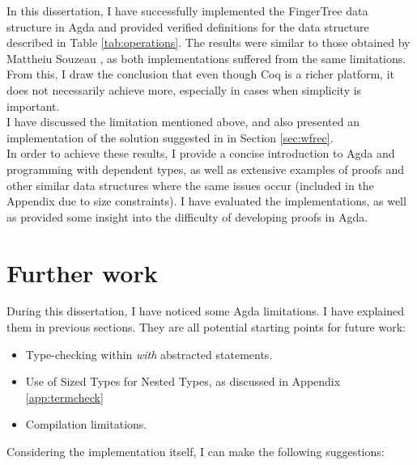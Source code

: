 \documentclass[12pt,twoside,notitlepage]{report}
\begin{document}
In this dissertation, I have successfully implemented the FingerTree data structure \cite{fingertrees} in Agda \cite{agdatutorial} and provided verified definitions for the data structure described in Table \ref{tab:operations}. The results were similar to those obtained by Mattheiu Souzeau \cite{coq}, as both implementations suffered from the same limitations. From this, I draw the conclusion that even though Coq is a richer platform, it does not necessarily achieve more, especially in cases when simplicity is important. \\
I have discussed the limitation mentioned above, and also presented an implementation of the solution suggested in \cite{coq} in Section \ref{sec:wfrec}. 
\\
In order to achieve these results, I provide a concise introduction to Agda and programming with dependent types, as well as extensive examples of proofs and other similar data structures where the same issues occur (included in the Appendix due to size constraints).
I have evaluated the implementations, as well as provided some insight into the difficulty of developing proofs in Agda.


\section{Further work}

During this dissertation, I have noticed some Agda limitations. I have explained them in previous sections. They are all potential starting points for future work:

\begin{itemize}
\item Type-checking within \textit{with} abstracted statements.
\item Use of Sized Types for Nested Types, as discussed in Appendix \ref{app:termcheck}
\item Compilation limitations.
\end{itemize} \hfill

\noindent Considering the implementation itself, I can make the following suggestions:
\end{document}
